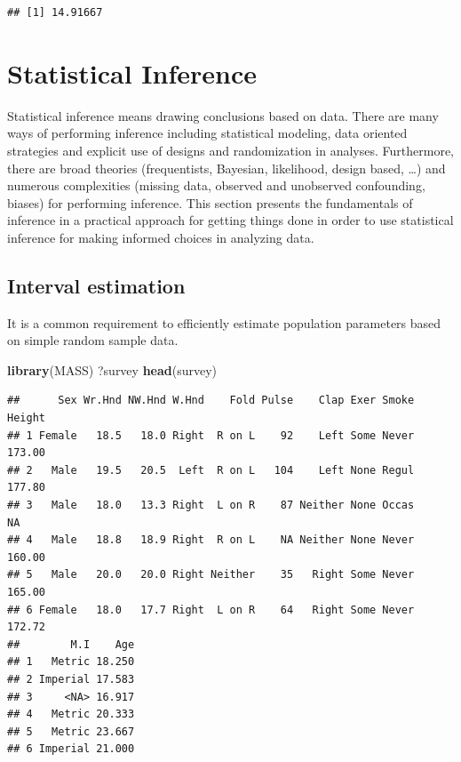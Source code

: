 \documentclass[]{article}
\newenvironment{Shaded}{\begin{snugshade}}{\end{snugshade}}
\newcommand{\KeywordTok}[1]{\textcolor[rgb]{0.13,0.29,0.53}{\textbf{{#1}}}}
\newcommand{\NormalTok}[1]{{#1}}
\numberwithin{equation}{section}
\begin{document}
\begin{verbatim}
## [1] 14.91667
\end{verbatim}

\section{Statistical Inference}\label{statistical-inference}

Statistical inference means drawing conclusions based on data. There are
many ways of performing inference including statistical modeling, data
oriented strategies and explicit use of designs and randomization in
analyses. Furthermore, there are broad theories (frequentists, Bayesian,
likelihood, design based, \ldots{}) and numerous complexities (missing
data, observed and unobserved confounding, biases) for performing
inference. This section presents the fundamentals of inference in a
practical approach for getting things done in order to use statistical
inference for making informed choices in analyzing data.

\subsection{Interval estimation}\label{interval-estimation}

It is a common requirement to efficiently estimate population parameters
based on simple random sample data.

\begin{Shaded}
\begin{Highlighting}[]
\KeywordTok{library}\NormalTok{(MASS)}
\NormalTok{?survey}
\KeywordTok{head}\NormalTok{(survey)}
\end{Highlighting}
\end{Shaded}

\begin{verbatim}
##      Sex Wr.Hnd NW.Hnd W.Hnd    Fold Pulse    Clap Exer Smoke Height
## 1 Female   18.5   18.0 Right  R on L    92    Left Some Never 173.00
## 2   Male   19.5   20.5  Left  R on L   104    Left None Regul 177.80
## 3   Male   18.0   13.3 Right  L on R    87 Neither None Occas     NA
## 4   Male   18.8   18.9 Right  R on L    NA Neither None Never 160.00
## 5   Male   20.0   20.0 Right Neither    35   Right Some Never 165.00
## 6 Female   18.0   17.7 Right  L on R    64   Right Some Never 172.72
##        M.I    Age
## 1   Metric 18.250
## 2 Imperial 17.583
## 3     <NA> 16.917
## 4   Metric 20.333
## 5   Metric 23.667
## 6 Imperial 21.000
\end{verbatim}
\end{document}
